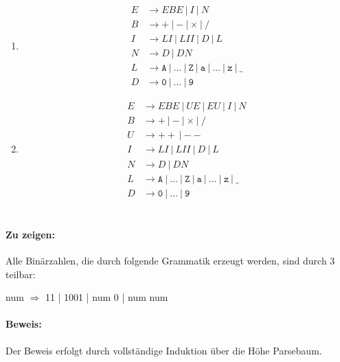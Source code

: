 \documentclass[a4paper,10pt]{scrartcl}
\begin{document}
\section{}
\begin{enumerate}
 \item	
    \begin{align*}
     E &\to EBE\ |\ I\ |\ N\\
     B &\to \mathtt{+}\ |\ \mathtt{-}\ |\ \mathtt{\times}\ |\ \mathtt{/}\\
     I &\to LI\ |\ LII\ |\ D\ |\ L \\
     N &\to D\ |\ DN \\
     L &\to \mathtt{A}\ |\ \dots\ |\ \mathtt{Z}\ |\ \mathtt{a}\ |\ \dots\ |\
\mathtt{z}\ |\ \mathtt{\_}\\
     D &\to \mathtt{0}\ |\ \dots\ |\ \mathtt{9} 
    \end{align*}
 \item	
    \begin{align*}
     E &\to EBE\ |\ UE\ |\ EU\ |\ I\ |\ N\\
     B &\to \mathtt{+}\ |\ \mathtt{-}\ |\ \mathtt{\times}\ |\ \mathtt{/}\\
     U &\to \mathtt{++}\ |\ \mathtt{--}\\
     I &\to LI\ |\ LII\ |\ D\ |\ L \\
     N &\to D\ |\ DN \\
     L &\to \mathtt{A}\ |\ \dots\ |\ \mathtt{Z}\ |\ \mathtt{a}\ |\ \dots\ |\
\mathtt{z}\ |\ \mathtt{\_}\\
     D &\to \mathtt{0}\ |\ \dots\ |\ \mathtt{9} 
    \end{align*}
\end{enumerate}

\section{}
\paragraph{Zu zeigen:}
Alle Binärzahlen, die durch folgende Grammatik erzeugt werden, sind durch 3 teilbar:

num $\Rightarrow$ 11 | 1001 | num 0 | num num

\paragraph{Beweis:}
Der Beweis erfolgt durch vollständige Induktion über die Höhe Parsebaum.
\end{document}
